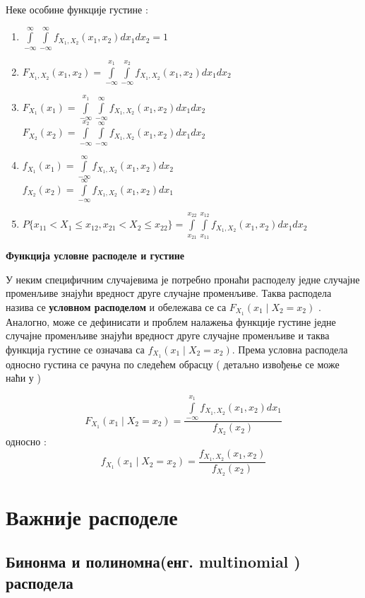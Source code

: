  
Неке особине функције густине :

\begin{enumerate}
\item  $ \int \limits_{-\infty}^{\infty}\int \limits_{-\infty}^{\infty} f_{X_1,X_2}(x_1,x_2)dx_1dx_2 = 1$
\item  $F_{X_1,X_2}(x_1,x_2) =  \int \limits_{-\infty}^{x_1}\int \limits_{-\infty}^{x_2} f_{X_1,X_2}(x_1,x_2)dx_1dx_2$
\item  $F_{X_1}(x_1) =  \int \limits_{-\infty}^{x_1}\int \limits_{-\infty}^{\infty} f_{X_1,X_2}(x_1,x_2)dx_1dx_2$ \\
$F_{X_2}(x_2) =  \int \limits_{-\infty}^{x_2}\int \limits_{-\infty}^{\infty} f_{X_1,X_2}(x_1,x_2)dx_1dx_2$ 
\item $f_{X_1}(x_1) =  \int \limits_{-\infty}^{\infty} f_{X_1,X_2}(x_1,x_2)dx_2$ \\
$f_{X_2}(x_2) =  \int \limits_{-\infty}^{\infty} f_{X_1,X_2}(x_1,x_2)dx_1$ 
\item $P \lbrace x_{11} < X_1 \leq x_{12}, x_{21}<X_2 \leq x_{22} \rbrace =  \int \limits_{x_{21}}^{x_{22}}\int \limits_{x_{11}}^{x_{12}} f_{X_1,X_2}(x_1,x_2)dx_1dx_2 $
	
\end{enumerate}


\textbf{Функција условне расподеле и густине}


У неким специфичним случајевима је потребно пронаћи расподелу једне случајне променљиве знајући вредност друге случајне променљиве. Таква расподела назива се \textbf{условном расподелом} и обележава се са $F_{X_1}(x_1 \mid X_2 = x_2)$ . Аналогно, може се дефинисати и проблем налажења функције густине једне случајне променљиве знајући вредност друге случајне променљиве и таква функција густине  се означава са $f_{X_1}(x_1 \mid X_2 = x_2 )$. Према \cite{verov4} условна расподела односно густина се рачуна по следећем обрасцу ( детаљно извођење се може наћи у \cite{verov4})

$$  F_{X_1}(x_1 \mid X_2 = x_2) = \frac{\int \limits_{-\infty}^{x_1} f_{X_1,X_2}(x_1,x_2)dx_1}{f_{X_2}(x_2)} $$
односно :
$$  f_{X_1}(x_1 \mid X_2 = x_2) = \frac{f_{X_1,X_2}(x_1,x_2)}{f_{X_2}(x_2)} $$




\section{Важније расподеле}
\subsection{Бинонма и полиномна(енг. multinomial ) расподела}

